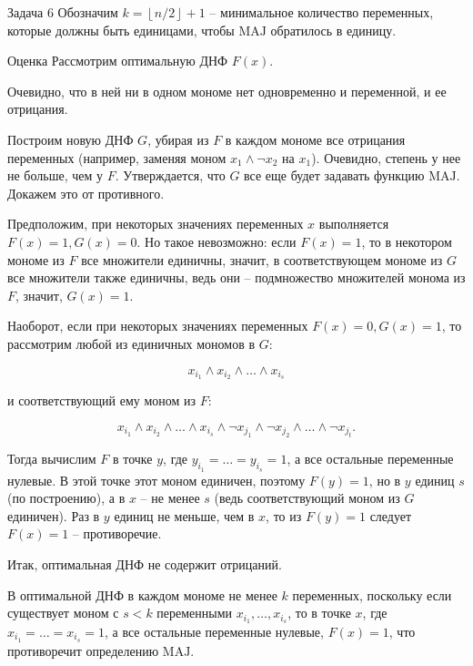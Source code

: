 \documentclass{article}
\newcommand{\floor}[1]{\left\lfloor#1\right\rfloor}
\begin{document}
	\begin{section}{Задача 6}
		Обозначим $k = \floor{n/2} + 1$ -- минимальное количество переменных, которые должны быть единицами, чтобы $\mathrm{MAJ}$ обратилось в единицу.

		\begin{subsection}{Оценка}
			Рассмотрим оптимальную ДНФ $F(x)$.

			Очевидно, что в ней ни в одном мономе нет одновременно и переменной, и ее отрицания.

			Построим новую ДНФ $G$, убирая из $F$ в каждом мономе все отрицания переменных (например, заменяя моном $x_1 \land \neg x_2$ на $x_1$). Очевидно, степень у нее не больше, чем у $F$. Утверждается, что $G$ все еще будет задавать функцию $\mathrm{MAJ}$. Докажем это от противного.

			Предположим, при некоторых значениях переменных $x$ выполняется $F(x) = 1, G(x) = 0$. Но такое невозможно: если $F(x) = 1$, то в некотором мономе из $F$ все множители единичны, значит, в соответствующем мономе из $G$ все множители также единичны, ведь они -- подмножество множителей монома из $F$, значит, $G(x) = 1$.

			Наоборот, если при некоторых значениях переменных $F(x) = 0, G(x) = 1$, то рассмотрим любой из единичных мономов в $G$:

			\begin{equation*}
				x_{i_1} \land x_{i_2} \land \dots \land x_{i_s}
			\end{equation*}

			и соответствующий ему моном из $F$:

			\begin{equation*}
				x_{i_1} \land x_{i_2} \land \dots \land x_{i_s} \land \neg x_{j_1} \land \neg x_{j_2} \land \dots \land \neg x_{j_t}.
			\end{equation*}

			Тогда вычислим $F$ в точке $y$, где $y_{i_1} = \dots = y_{i_s} = 1$, а все остальные переменные нулевые. В этой точке этот моном единичен, поэтому $F(y) = 1$, но в $y$ единиц $s$ (по построению), а в $x$ -- не менее $s$ (ведь соответствующий моном из $G$ единичен). Раз в $y$ единиц не меньше, чем в $x$, то из $F(y) = 1$ следует $F(x) = 1$ -- противоречие.

			Итак, оптимальная ДНФ не содержит отрицаний.

			В оптимальной ДНФ в каждом мономе не менее $k$ переменных, поскольку если существует моном с $s < k$ переменными $x_{i_1}, \dots, x_{i_s}$, то в точке $x$, где $x_{i_1} = \dots = x_{i_s} = 1$, а все остальные переменные нулевые, $F(x) = 1$, что противоречит определению $\mathrm{MAJ}$.


\end{subsection}
\end{section}
\end{document}
